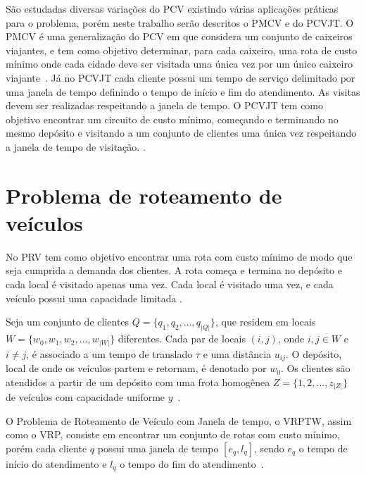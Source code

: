 São estudadas diversas variações do \ac{PCV} existindo várias aplicações práticas para o problema, porém neste trabalho serão descritos o \ac{PMCV} e do \ac{PCVJT}. O \ac{PMCV} é uma generalização do \ac{PCV} em que considera um conjunto de caixeiros viajantes, e tem como objetivo determinar, para cada caixeiro, uma rota de custo mínimo onde cada cidade deve ser visitada uma única vez por um único caixeiro viajante~\cite{meng:2012}.  Já no \ac{PCVJT} cada cliente possui um tempo de serviço delimitado por uma janela de tempo definindo o tempo de início e fim do atendimento. As visitas devem ser realizadas respeitando a janela de tempo. O \ac{PCVJT} tem como objetivo encontrar um circuito de custo mínimo, começando e terminando no mesmo depósito e visitando a um conjunto de clientes uma única vez respeitando a janela de tempo de visitação. \cite{urrutia:2010}.



\section{Problema de roteamento de veículos}

No \ac{PRV} tem como objetivo encontrar uma rota com custo mínimo de modo que seja cumprida a demanda dos clientes. A rota começa e termina no depósito e cada local é visitado apenas uma vez. Cada local é visitado uma vez, e cada veículo possui uma capacidade limitada \cite{gold:2008}.

Seja um conjunto de clientes $Q = \{q_1, q_2, ..., q_{|Q|}\}$, que residem em locais $W = \{w_0, w_1, w_2, ..., w_{|W|}\}$ diferentes. Cada par de locais $(i,j)$, onde  $i,j \in W$ e $i \neq j$, é associado a um tempo de translado $\tau$ e uma distância $u_{ij}$. O depósito, local de onde os veículos partem e retornam, é denotado por $w_0$.
Os clientes são atendidos a partir de um depósito com uma frota  homogênea $Z = \{1, 2, ..., z_{|Z|}\}$ de veículos com capacidade uniforme $y$~\cite{gold:2008}.

O Problema de Roteamento de Veículo com Janela de tempo, o \ac{VRPTW}, assim como o \ac{VRP}, consiste em encontrar um conjunto de rotas com custo mínimo, porém cada cliente $q$ possui uma janela de tempo $[e_{q}, l_{q}]$, sendo $e_{q}$ o tempo de início do atendimento e $l_{q}$ o tempo do fim do atendimento~\cite{gold:2008}.